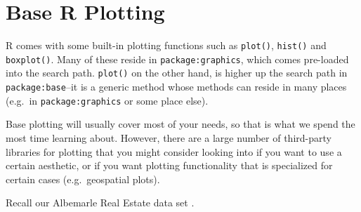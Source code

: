 \documentclass[12pt,krantz2]{krantz}
\makeatletter
\newenvironment{Shaded}{\begin{snugshade}}{\end{snugshade}}
\newcommand{\CommentTok}[1]{\textcolor[rgb]{0.37,0.37,0.37}{\textit{#1}}}
\newcommand{\DataTypeTok}[1]{\textcolor[rgb]{0.27,0.27,0.27}{#1}}
\newcommand{\KeywordTok}[1]{\textcolor[rgb]{0.27,0.27,0.27}{\textbf{#1}}}
\newcommand{\NormalTok}[1]{#1}
\newcommand{\StringTok}[1]{\textcolor[rgb]{0.5,0.5,0.5}{#1}}
\newenvironment{kframe}{%
\medskip{}
\setlength{\fboxsep}{.8em}
 \def\at@end@of@kframe{}%
 \ifinner\ifhmode%
  \def\at@end@of@kframe{\end{minipage}}%
  \begin{minipage}{\columnwidth}%
 \fi\fi%
 \def\FrameCommand##1{\hskip\@totalleftmargin \hskip-\fboxsep
 \colorbox{shadecolor}{##1}\hskip-\fboxsep
     \hskip-\linewidth \hskip-\@totalleftmargin \hskip\columnwidth}%
 \MakeFramed {\advance\hsize-\width
   \@totalleftmargin\z@ \linewidth\hsize
   \@setminipage}}%
 {\par\unskip\endMakeFramed%
 \at@end@of@kframe}
\renewenvironment{Shaded}{\begin{kframe}}{\end{kframe}}
\makeatother
\begin{document}
\hypertarget{base-r-plotting}{%
\section{Base R Plotting}\label{base-r-plotting}}

R comes with some built-in plotting functions such as \texttt{plot()}, \texttt{hist()} and \texttt{boxplot()}. Many of these reside in \texttt{package:graphics}, which comes pre-loaded into the search path. \texttt{plot()} on the other hand, is higher up the search path in \texttt{package:base}--it is a generic method whose methods can reside in many places (e.g.~in \texttt{package:graphics} or some place else).

Base plotting will usually cover most of your needs, so that is what we spend the most time learning about. However, there are a large number of third-party libraries for plotting that you might consider looking into if you want to use a certain aesthetic, or if you want plotting functionality that is specialized for certain cases (e.g.~geospatial plots).

Recall our Albemarle Real Estate data set \citep{albemarle_county_gis_web} \citep{clay_ford}.

\begin{Shaded}
\end{Shaded}
\end{document}
